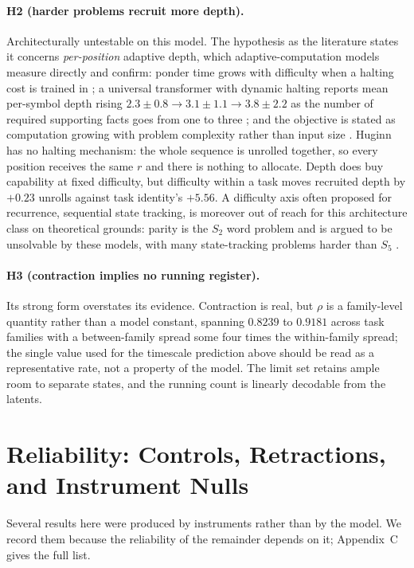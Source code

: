 \documentclass{zapiski}
\begin{document}
\paragraph{H2 (harder problems recruit more depth).} Architecturally untestable on this model.
The hypothesis as the literature states it concerns \emph{per-position} adaptive depth, which
adaptive-computation models measure directly and confirm: ponder time grows with difficulty when a
halting cost is trained in \cite{graves2016act}; a universal transformer with dynamic halting
reports mean per-symbol depth rising $2.3\pm0.8 \rightarrow 3.1\pm1.1 \rightarrow 3.8\pm2.2$ as the
number of required supporting facts goes from one to three \cite{dehghani2019ut}; and the objective
is stated as computation growing with problem complexity rather than input size
\cite{banino2021pondernet}. Huginn has no halting mechanism: the
whole sequence is unrolled together, so every position receives the same $r$ and there is nothing
to allocate. Depth does buy capability at fixed difficulty, but difficulty within a task moves
recruited depth by $+0.23$ unrolls against task identity's $+5.56$. A difficulty axis often proposed for recurrence,
sequential state tracking, is moreover out of reach for this architecture class on
theoretical grounds: parity is the $S_2$ word problem and is argued to be unsolvable by
these models, with many state-tracking problems harder than $S_5$
\cite{grazzi2024statetracking}.

\paragraph{H3 (contraction implies no running register).} Its strong form overstates its evidence.
Contraction is real, but $\rho$ is a family-level quantity rather than a model constant, spanning
$0.8239$ to $0.9181$ across task families with a between-family spread some four times the
within-family spread; the single value used for the timescale prediction above should be read as a
representative rate, not a property of the model. The limit set retains ample room to separate
states, and the running count is linearly decodable from the latents.

\section{Reliability: Controls, Retractions, and Instrument Nulls}

Several results here were produced by instruments rather than by the model. We record them because
the reliability of the remainder depends on it; Appendix~C gives the full list.
\end{document}
